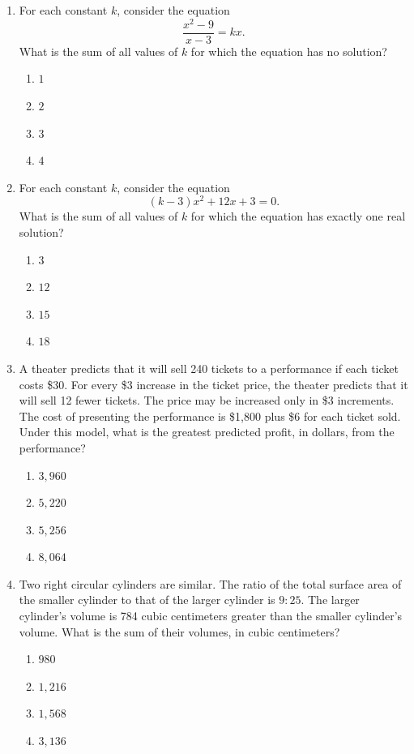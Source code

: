 \documentclass[12pt]{article}
\begin{document}
\begin{enumerate}[leftmargin=*,itemsep=1em]
  \vfill
  \item For each constant $k$, consider the equation
  \[
    \frac{x^2-9}{x-3}=kx.
  \]
  What is the sum of all values of $k$ for which the equation has no solution?
  \begin{enumerate}[label=\Alph*.,itemsep=0pt]
    \item $1$ \item $2$ \item $3$ \item $4$
  \end{enumerate}

  \vfill
  \item For each constant $k$, consider the equation
  \[
    (k-3)x^2+12x+3=0.
  \]
  What is the sum of all values of $k$ for which the equation has exactly one real solution?
  \begin{enumerate}[label=\Alph*.,itemsep=0pt]
    \item $3$ \item $12$ \item $15$ \item $18$
  \end{enumerate}

  \vfill
  \newpage
  \item A theater predicts that it will sell 240 tickets to a performance if each ticket costs \$30. For every \$3 increase in the ticket price, the theater predicts that it will sell 12 fewer tickets. The price may be increased only in \$3 increments. The cost of presenting the performance is \$1,800 plus \$6 for each ticket sold. Under this model, what is the greatest predicted profit, in dollars, from the performance?
  \begin{enumerate}[label=\Alph*.,itemsep=0pt]
    \item $3{,}960$ \item $5{,}220$ \item $5{,}256$ \item $8{,}064$
  \end{enumerate}

  \vfill
  \item Two right circular cylinders are similar. The ratio of the total surface area of the smaller cylinder to that of the larger cylinder is $9:25$. The larger cylinder's volume is 784 cubic centimeters greater than the smaller cylinder's volume. What is the sum of their volumes, in cubic centimeters?
  \begin{enumerate}[label=\Alph*.,itemsep=0pt]
    \item $980$ \item $1{,}216$ \item $1{,}568$ \item $3{,}136$
  \end{enumerate}


\end{enumerate}
\end{document}

